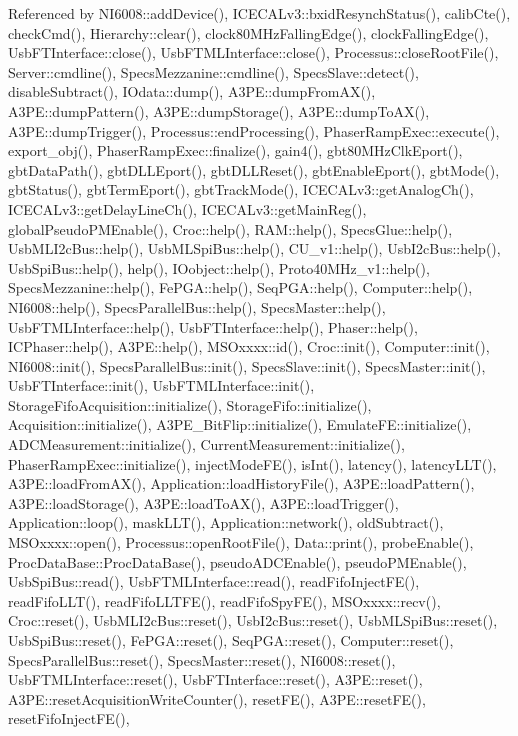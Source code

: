 Referenced by N\+I6008\+::add\+Device(), I\+C\+E\+C\+A\+Lv3\+::bxid\+Resynch\+Status(), calib\+Cte(), check\+Cmd(), Hierarchy\+::clear(), clock80\+M\+Hz\+Falling\+Edge(), clock\+Falling\+Edge(), Usb\+F\+T\+Interface\+::close(), Usb\+F\+T\+M\+L\+Interface\+::close(), Processus\+::close\+Root\+File(), Server\+::cmdline(), Specs\+Mezzanine\+::cmdline(), Specs\+Slave\+::detect(), disable\+Subtract(), I\+Odata\+::dump(), A3\+P\+E\+::dump\+From\+A\+X(), A3\+P\+E\+::dump\+Pattern(), A3\+P\+E\+::dump\+Storage(), A3\+P\+E\+::dump\+To\+A\+X(), A3\+P\+E\+::dump\+Trigger(), Processus\+::end\+Processing(), Phaser\+Ramp\+Exec\+::execute(), export\+\_\+obj(), Phaser\+Ramp\+Exec\+::finalize(), gain4(), gbt80\+M\+Hz\+Clk\+Eport(), gbt\+Data\+Path(), gbt\+D\+L\+L\+Eport(), gbt\+D\+L\+L\+Reset(), gbt\+Enable\+Eport(), gbt\+Mode(), gbt\+Status(), gbt\+Term\+Eport(), gbt\+Track\+Mode(), I\+C\+E\+C\+A\+Lv3\+::get\+Analog\+Ch(), I\+C\+E\+C\+A\+Lv3\+::get\+Delay\+Line\+Ch(), I\+C\+E\+C\+A\+Lv3\+::get\+Main\+Reg(), global\+Pseudo\+P\+M\+Enable(), Croc\+::help(), R\+A\+M\+::help(), Specs\+Glue\+::help(), Usb\+M\+L\+I2c\+Bus\+::help(), Usb\+M\+L\+Spi\+Bus\+::help(), C\+U\+\_\+v1\+::help(), Usb\+I2c\+Bus\+::help(), Usb\+Spi\+Bus\+::help(), help(), I\+Oobject\+::help(), Proto40\+M\+Hz\+\_\+v1\+::help(), Specs\+Mezzanine\+::help(), Fe\+P\+G\+A\+::help(), Seq\+P\+G\+A\+::help(), Computer\+::help(), N\+I6008\+::help(), Specs\+Parallel\+Bus\+::help(), Specs\+Master\+::help(), Usb\+F\+T\+M\+L\+Interface\+::help(), Usb\+F\+T\+Interface\+::help(), Phaser\+::help(), I\+C\+Phaser\+::help(), A3\+P\+E\+::help(), M\+S\+Oxxxx\+::id(), Croc\+::init(), Computer\+::init(), N\+I6008\+::init(), Specs\+Parallel\+Bus\+::init(), Specs\+Slave\+::init(), Specs\+Master\+::init(), Usb\+F\+T\+Interface\+::init(), Usb\+F\+T\+M\+L\+Interface\+::init(), Storage\+Fifo\+Acquisition\+::initialize(), Storage\+Fifo\+::initialize(), Acquisition\+::initialize(), A3\+P\+E\+\_\+\+Bit\+Flip\+::initialize(), Emulate\+F\+E\+::initialize(), A\+D\+C\+Measurement\+::initialize(), Current\+Measurement\+::initialize(), Phaser\+Ramp\+Exec\+::initialize(), inject\+Mode\+F\+E(), is\+Int(), latency(), latency\+L\+L\+T(), A3\+P\+E\+::load\+From\+A\+X(), Application\+::load\+History\+File(), A3\+P\+E\+::load\+Pattern(), A3\+P\+E\+::load\+Storage(), A3\+P\+E\+::load\+To\+A\+X(), A3\+P\+E\+::load\+Trigger(), Application\+::loop(), mask\+L\+L\+T(), Application\+::network(), old\+Subtract(), M\+S\+Oxxxx\+::open(), Processus\+::open\+Root\+File(), Data\+::print(), probe\+Enable(), Proc\+Data\+Base\+::\+Proc\+Data\+Base(), pseudo\+A\+D\+C\+Enable(), pseudo\+P\+M\+Enable(), Usb\+Spi\+Bus\+::read(), Usb\+F\+T\+M\+L\+Interface\+::read(), read\+Fifo\+Inject\+F\+E(), read\+Fifo\+L\+L\+T(), read\+Fifo\+L\+L\+T\+F\+E(), read\+Fifo\+Spy\+F\+E(), M\+S\+Oxxxx\+::recv(), Croc\+::reset(), Usb\+M\+L\+I2c\+Bus\+::reset(), Usb\+I2c\+Bus\+::reset(), Usb\+M\+L\+Spi\+Bus\+::reset(), Usb\+Spi\+Bus\+::reset(), Fe\+P\+G\+A\+::reset(), Seq\+P\+G\+A\+::reset(), Computer\+::reset(), Specs\+Parallel\+Bus\+::reset(), Specs\+Master\+::reset(), N\+I6008\+::reset(), Usb\+F\+T\+M\+L\+Interface\+::reset(), Usb\+F\+T\+Interface\+::reset(), A3\+P\+E\+::reset(), A3\+P\+E\+::reset\+Acquisition\+Write\+Counter(), reset\+F\+E(), A3\+P\+E\+::reset\+F\+E(), reset\+Fifo\+Inject\+F\+E(), 
